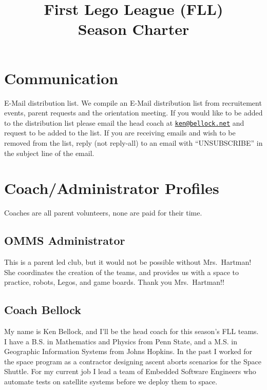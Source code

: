 \documentclass[letter]{article}
\author{}
\title{First Lego League (FLL) \\ \season{} Season Charter}
\date{}
\begin{document}
\maketitle
\thispagestyle{firststyle}

\hypertarget{communication}{%
\section{Communication}\label{communication}}

E-Mail distribution list. We compile an E-Mail distribution list from
recruitement events, parent requests and the orientation meeting. If you
would like to be added to the distribution list please email the head
coach at \href{mailto:ken@bellock.net}{\nolinkurl{ken@bellock.net}} and
request to be added to the list. If you are receiving emails and wish to
be removed from the list, reply (not reply-all) to an email with
``UNSUBSCRIBE'' in the subject line of the email.

\hypertarget{coach-profiles}{%
\section{Coach/Administrator Profiles}\label{coach-profiles}}

Coaches are all parent volunteers, none are paid for their time.

\hypertarget{omms-sponsor}{%
\subsection{OMMS Administrator}\label{omms-sponsor}}

This is a parent led club, but it would not be possible without
Mrs.~Hartman! She coordinates the creation of the teams, and provides us
with a space to practice, robots, Legos, and game boards. Thank you
Mrs.~Hartman!!

\hypertarget{head-coach}{%
\subsection{Coach Bellock}\label{head-coach}}

My name is Ken Bellock, and I'll be the head coach for this season's FLL
teams. I have a B.S. in Mathematics and Physics from Penn State, and a
M.S. in Geographic Information Systems from Johns Hopkins. In the past I
worked for the space program as a contractor designing ascent aborts
scenarios for the Space Shuttle. For my current job I lead a team of
Embedded Software Engineers who automate tests on satellite systems
before we deploy them to space.
\end{document}
